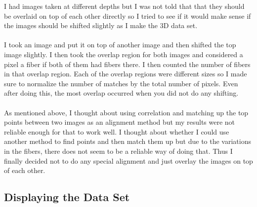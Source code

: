 \documentclass[11pt,psfig]{article}
\begin{document}
I had images taken at different depths but I was not told that that they should be overlaid on top of each other directly so I tried to see if it would make sense if the images should be shifted slightly as I make the 3D data set. \\
\\
I took an image and put it on top of another image and then shifted the top image slightly. I then took the overlap region for both images and considered a pixel a fiber if both of them had fibers there. I then counted the number of fibers in that overlap region. Each of the overlap regions were different sizes so I made sure to normalize the number of matches by the total number of pixels. Even after doing this, the most overlap occurred when you did not do any shifting. \\
\\
As mentioned above, I thought about using correlation and matching up the top points between two images as an alignment method but my results were not reliable enough for that to work well. I thought about whether I could use another method to find points and then match them up but due to the variations in the fibers, there does not seem to be a reliable way of doing that. Thus I finally decided not to do any special alignment and just overlay the images on top of each other.

\subsection{Displaying the Data Set}
\end{document}
